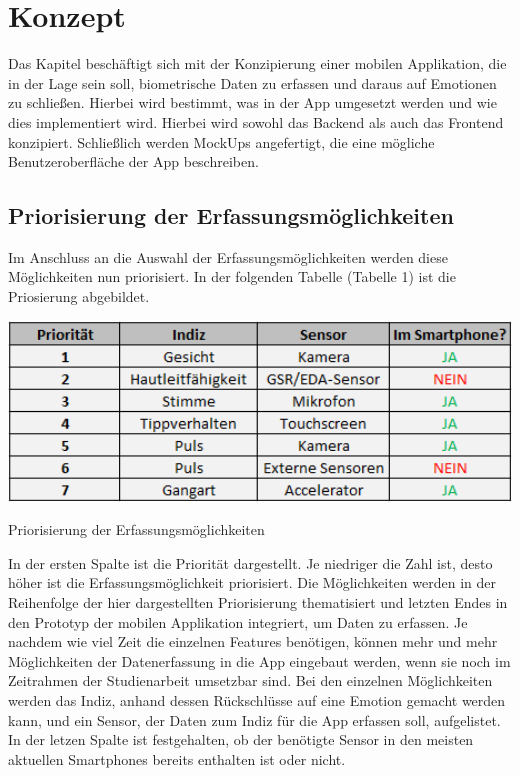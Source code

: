 \section{Konzept}
Das Kapitel beschäftigt sich mit der Konzipierung einer mobilen Applikation, die in der Lage sein soll, biometrische Daten zu erfassen und daraus auf Emotionen zu schließen. Hierbei wird bestimmt, was in der App umgesetzt werden und wie dies implementiert wird. Hierbei wird sowohl das Backend als auch das Frontend konzipiert. Schließlich werden MockUps angefertigt, die eine mögliche Benutzeroberfläche der App beschreiben.
\subsection{Priorisierung der Erfassungsmöglichkeiten}
Im Anschluss an die Auswahl der Erfassungsmöglichkeiten werden diese Möglichkeiten nun priorisiert. In der folgenden Tabelle (Tabelle 1) ist die Priosierung abgebildet. \newline
\begin{table}[h]
	\centering
	\includegraphics[width=16cm]{Bilder/prio.png}
	\caption[Priorisierung der Erfassungsmöglichkeiten]{Priorisierung der Erfassungsmöglichkeiten}
\end{table}%
\newline In der ersten Spalte ist die Priorität dargestellt. Je niedriger die Zahl ist, desto höher ist die Erfassungsmöglichkeit priorisiert. Die Möglichkeiten werden in der Reihenfolge der hier dargestellten Priorisierung thematisiert und letzten Endes in den Prototyp der mobilen Applikation integriert, um Daten zu erfassen. Je nachdem wie viel Zeit die einzelnen Features benötigen, können mehr und mehr Möglichkeiten der Datenerfassung in die App eingebaut werden, wenn sie noch im Zeitrahmen der Studienarbeit umsetzbar sind. Bei den einzelnen Möglichkeiten werden das Indiz, anhand dessen Rückschlüsse auf eine Emotion gemacht werden kann, und ein Sensor, der Daten zum Indiz für die App erfassen soll, aufgelistet. In der letzen Spalte ist festgehalten, ob der benötigte Sensor in den meisten aktuellen Smartphones bereits enthalten ist oder nicht. \newline
